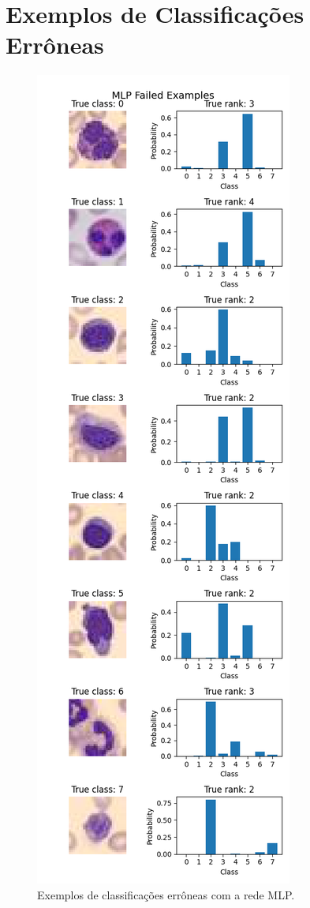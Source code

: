 \documentclass[final,5p]{elsarticle}
\numberwithin{equation}{section}
\begin{document}
    \section{Exemplos de Classificações Errôneas}

        \begin{figure}[H]
            \includegraphics[width=0.8\columnwidth]{MLP_fails.png}
            \caption{Exemplos de classificações errôneas com a rede MLP.}\label{fig:ErrosMLP}
        \end{figure}
\end{document}
